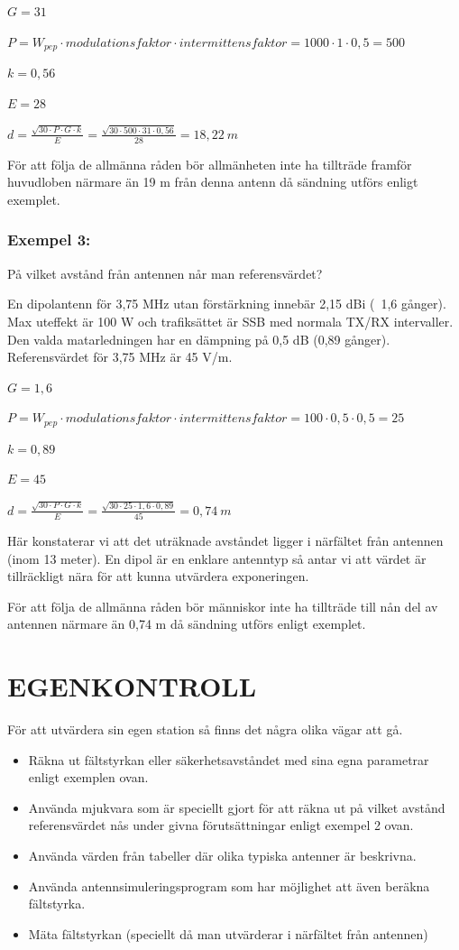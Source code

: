 \(G = 31\)

\(P = W_{pep} \cdot modulationsfaktor \cdot intermittensfaktor
= 1000 \cdot 1 \cdot 0,5 = 500\)

\(k = 0,56\)

\(E = 28\)

\(d = \frac{\sqrt{30 \cdot P \cdot G \cdot k}}{E}
= \frac{\sqrt{30 \cdot 500 \cdot 31 \cdot 0,56}}{28}
= 18,22\ m\)

För att följa de allmänna råden bör allmänheten inte ha tillträde framför
huvudloben närmare än 19 m från denna antenn då sändning utförs
enligt exemplet.

\subsubsection{Exempel 3:}

På vilket avstånd från antennen når man referensvärdet?

En dipolantenn för 3,75 MHz utan förstärkning innebär 2,15 dBi (~1,6 gånger).
Max uteffekt är 100 W och trafiksättet är SSB med normala TX/RX intervaller.
Den valda matarledningen har en dämpning på 0,5 dB (0,89 gånger).
Referensvärdet för 3,75 MHz är 45 V/m.

\(G = 1,6\)

\(P = W_{pep} \cdot modulationsfaktor \cdot intermittensfaktor
= 100 \cdot 0,5 \cdot 0,5 = 25\)

\(k = 0,89\)

\(E = 45\)

\(d = \frac{\sqrt{30 \cdot P \cdot G \cdot k}}{E} = \frac{\sqrt{30 \cdot 25 \cdot 1,6 \cdot 0,89}}{45}
= 0,74\ m\)

Här konstaterar vi att det uträknade avståndet ligger i närfältet från
antennen (inom 13 meter). En dipol är en enklare antenntyp så antar vi
att värdet är tillräckligt nära för att kunna utvärdera exponeringen.

För att följa de allmänna råden bör människor inte ha tillträde till
nån del av antennen närmare än 0,74 m då sändning utförs enligt exemplet.

\section{EGENKONTROLL}

För att utvärdera sin egen station så finns det några olika vägar att gå.

\begin{itemize}
\item Räkna ut fältstyrkan eller säkerhetsavståndet med sina egna
parametrar enligt exemplen ovan.
\item Använda mjukvara som är speciellt gjort för att räkna ut på
vilket avstånd referensvärdet nås under givna förutsättningar enligt
exempel 2 ovan.
\item Använda värden från tabeller där olika typiska antenner är beskrivna.
\item Använda antennsimuleringsprogram som har möjlighet att även
beräkna fältstyrka.
\item Mäta fältstyrkan (speciellt då man utvärderar i närfältet från antennen)
\end{itemize}

